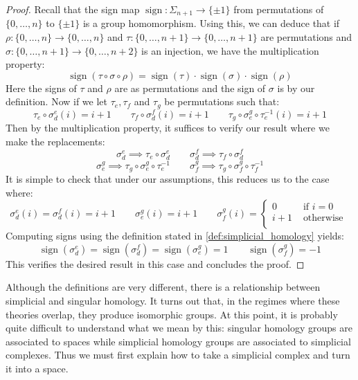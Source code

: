 \documentclass[12pt]{article}
\theoremstyle{definition}
\numberwithin{equation}{section}
\newcommand{\op}{\operatorname}
\begin{document}
\begin{proof} Recall that the sign map $\op{sign}:\Sigma_{n+1} \to \{\pm 1\}$ from permutations of $\{0,\dots,n\}$ to $\{\pm 1\}$ is a group homomorphism. Using this, we can deduce that if $\rho:\{0,\dots,n\} \to \{0,\dots,n\}$ and $\tau:\{0,\dots,n+1\} \to \{0,\dots,n+1\}$ are permutations and $\sigma:\{0,\dots,n+1\} \to \{0,\dots,n+2\}$ is an injection, we have the multiplication property:
\[
\op{sign}(\tau \circ \sigma \circ \rho) = \op{sign}(\tau) \cdot \op{sign}(\sigma) \cdot \op{sign}(\rho)
\]
Here the signs of $\tau$ and $\rho$ are as permutations and the sign of $\sigma$ is by our definition. Now if we let $\tau_e,\tau_f$ and $\tau_g$ be permutations such that:
\[\tau_e \circ \sigma^e_d(i) = i+1 \qquad \tau_f \circ \sigma^f_d(i) = i+1 \qquad \tau_g \circ \sigma^g_e \circ \tau_e^{-1}(i) = i+1\] 
Then by the multiplication property, it suffices to verify our result where we make the replacements:
\[\sigma^e_d \implies \tau_e \circ \sigma^e_d \qquad \sigma^f_d \implies \tau_f \circ \sigma^f_d\]
\[\sigma^g_e \implies \tau_g \circ \sigma^g_e \circ \tau_e^{-1} \qquad \sigma^g_f \implies \tau_g \circ \sigma^g_f \circ \tau_f^{-1}\]
It is simple to check that under our assumptions, this reduces us to the case where:
\[
\sigma^e_d(i) = \sigma^f_d(i) = i+1 \qquad \sigma^g_e(i) = i+1 \qquad
\sigma^g_f(i) = 
\left\{\begin{array}{cc}
0 & \text{ if }i = 0\\
i+1 & \text{ otherwise }\\
\end{array}\right.
\]
Computing signs using the definition stated in \ref{def:simplicial_homology} yields:
\[
\op{sign}(\sigma^e_d) = \op{sign}(\sigma^f_d) = \op{sign}(\sigma^g_e) = 1 \qquad \op{sign}(\sigma^g_f) = -1
\]
This verifies the desired result in this case and concludes the proof.\end{proof}

Although the definitions are very different, there is a relationship between simplicial and singular homology. It turns out that, in the regimes where these theories overlap, they produce isomorphic groups. At this point, it is probably quite difficult to understand what we mean by this: singular homology groups are associated to spaces while simplicial homology groups are associated to simplicial complexes. Thus we must first explain how to take a simplicial complex and turn it into a space.
\end{document}
